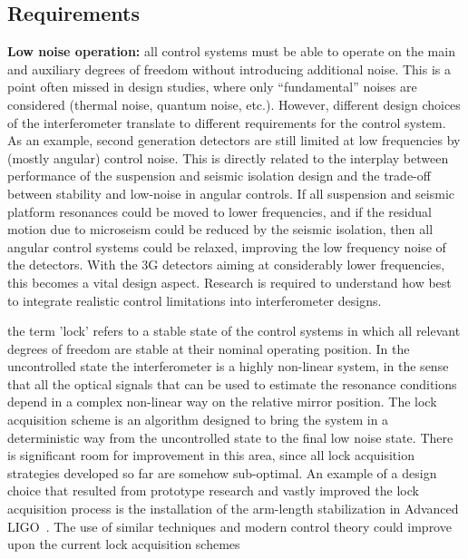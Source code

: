 \subsection{Requirements}
{\bf Low noise operation:} all control systems must be able to operate on the main and auxiliary degrees of freedom without introducing additional noise. 
This is a point often missed in design studies, where only ``fundamental'' noises are considered (thermal noise, quantum noise, etc.). However, different design choices of the interferometer translate to different requirements for the control system. As an example, second generation detectors are still limited at low frequencies by (mostly angular) control noise. 
This is directly related to the interplay between performance of the suspension and seismic isolation design and the trade-off between stability and low-noise in angular controls. 
If all suspension and seismic platform resonances could be moved to lower frequencies, and if the residual motion due to microseism could be reduced by the seismic isolation, then all angular control systems could be relaxed, improving the low frequency noise of the detectors. 
With the \ac{3G}  detectors aiming at considerably lower frequencies, this becomes a vital design aspect. Research is required to understand how best to integrate realistic control limitations into interferometer designs.\par
{} the term 'lock' refers to a stable state of the control systems in which all relevant degrees of freedom are stable at their nominal operating position. In the uncontrolled state the interferometer is a highly non-linear system, in the sense that all the optical signals that can be used to estimate the resonance conditions depend in a complex non-linear way on the relative mirror position. The lock acquisition scheme is an algorithm designed to bring the system in a deterministic way from the uncontrolled state to the final low noise state. There is significant room for improvement in this area, since all lock acquisition strategies developed so far are somehow sub-optimal. An example of a design choice that resulted from prototype research and vastly improved the lock acquisition process is the installation of the arm-length stabilization in Advanced LIGO~\cite{Mullavey:12}. The use of similar techniques and modern control theory could improve upon the current lock acquisition schemes
